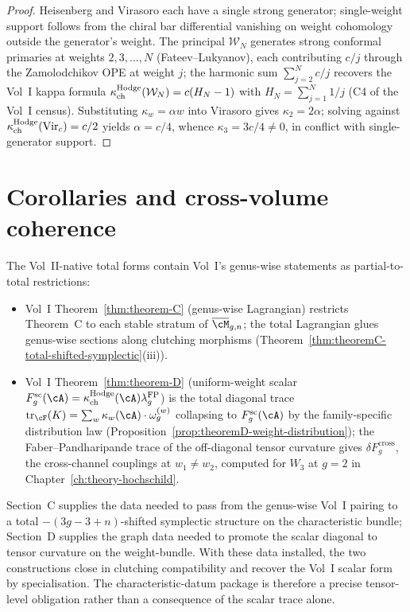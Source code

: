 \begin{proof}[Proof]
Heisenberg and Virasoro each have a single strong generator;
single-weight support follows from the chiral bar differential
vanishing on weight cohomology outside the generator's weight. The
principal $\mathcal{W}_N$ generates strong conformal primaries at
weights $2, 3, \ldots, N$ (Fateev--Lukyanov), each contributing
$c/j$ through the Zamolodchikov OPE at weight $j$; the harmonic
sum $\sum_{j=2}^N c/j$ recovers the Vol~I kappa formula
$\kappa_{\mathrm{ch}}^{\mathrm{Hodge}}(\mathcal{W}_N) = c(H_N - 1)$ with
$H_N = \sum_{j=1}^N 1/j$ (C4 of the Vol~I census). Substituting
$\kappa_w = \alpha w$ into Virasoro gives $\kappa_2 = 2\alpha$;
solving against $\kappa_{\mathrm{ch}}^{\mathrm{Hodge}}(\mathrm{Vir}_c) = c/2$ yields
$\alpha = c/4$, whence $\kappa_3 = 3c/4 \neq 0$, in conflict with
single-generator support.
\end{proof}

\section{Corollaries and cross-volume coherence}
\label{sec:theorems-C-D-cross-volume}

The Vol~II-native total forms contain Vol~I's genus-wise statements
as partial-to-total restrictions:

\begin{itemize}
 \item Vol~I Theorem~\ref*{thm:theorem-C} (genus-wise Lagrangian)
 restricts Theorem~C to each stable stratum of
 $\overline{\cM}_{g,n}$; the total Lagrangian glues genus-wise
 sections along clutching morphisms
 (Theorem~\ref{thm:theoremC-total-shifted-symplectic}(iii)).
 \item Vol~I Theorem~\ref*{thm:theorem-D} (uniform-weight scalar
 $F_g^{\mathrm{sc}}(\cA)
 =\kappaChHodge(\cA)\lambda_g^{\mathrm{FP}}$) is the total diagonal trace
 $\operatorname{tr}_\cF(K) = \sum_w \kappa_w(\cA) \cdot
 \omega_g^{(w)}$ collapsing to
 $F_g^{\mathrm{sc}}(\cA)$ by the family-specific
 distribution law
 (Proposition~\ref{prop:theoremD-weight-distribution}); the
 Faber--Pandharipande trace of the off-diagonal tensor curvature gives
 $\delta F_g^{\mathrm{cross}}$, the cross-channel couplings at
 $w_1 \neq w_2$, computed for $W_3$ at
 $g = 2$ in Chapter~\ref{ch:theory-hochschild}.
\end{itemize}

Section~C supplies the data needed to pass from the genus-wise Vol~I
pairing to a total $-(3g{-}3{+}n)$-shifted symplectic structure on the
characteristic bundle; Section~D supplies the graph data needed to
promote the scalar diagonal to tensor curvature on the weight-bundle.
With these data installed, the two constructions close in clutching
compatibility and recover the Vol~I scalar form by specialisation.  The
characteristic-datum package is therefore a precise tensor-level
obligation rather than a consequence of the scalar trace alone.
